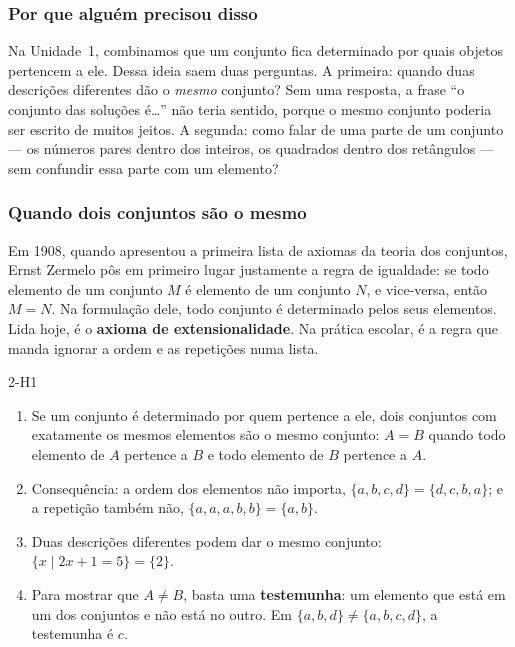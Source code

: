 \DeOndeVem

\subsubsection{Por que alguém precisou disso}
Na Unidade~1, combinamos que um conjunto fica determinado por quais objetos pertencem a ele. Dessa ideia saem duas perguntas. A primeira: quando duas descrições diferentes dão o \emph{mesmo} conjunto? Sem uma resposta, a frase \enquote{o conjunto das soluções é\ldots} não teria sentido, porque o mesmo conjunto poderia ser escrito de muitos jeitos. A segunda: como falar de uma parte de um conjunto — os números pares dentro dos inteiros, os quadrados dentro dos retângulos — sem confundir essa parte com um elemento?

\subsubsection{Quando dois conjuntos são o mesmo}
Em 1908, quando apresentou a primeira lista de axiomas da teoria dos conjuntos, Ernst Zermelo pôs em primeiro lugar justamente a regra de igualdade: se todo elemento de um conjunto $M$ é elemento de um conjunto $N$, e vice-versa, então $M=N$. Na formulação dele, todo conjunto é determinado pelos seus elementos. Lida hoje, é o \textbf{axioma de extensionalidade}. Na prática escolar, é a regra que manda ignorar a ordem e as repetições numa lista.

\begin{construcao}{2-H1}
\begin{enumerate}[label=(\arabic*)]
  \item Se um conjunto é determinado por quem pertence a ele, dois conjuntos com exatamente os mesmos elementos são o mesmo conjunto: $A=B$ quando todo elemento de $A$ pertence a $B$ e todo elemento de $B$ pertence a $A$.
  \item Consequência: a ordem dos elementos não importa, $\{a,b,c,d\}=\{d,c,b,a\}$; e a repetição também não, $\{a,a,a,b,b\}=\{a,b\}$.
  \item Duas descrições diferentes podem dar o mesmo conjunto: $\{x\mid 2x+1=5\}=\{2\}$.
  \item Para mostrar que $A\neq B$, basta uma \textbf{testemunha}: um elemento que está em um dos conjuntos e não está no outro. Em $\{a,b,d\}\neq\{a,b,c,d\}$, a testemunha é $c$.
\end{enumerate}
\end{construcao}


